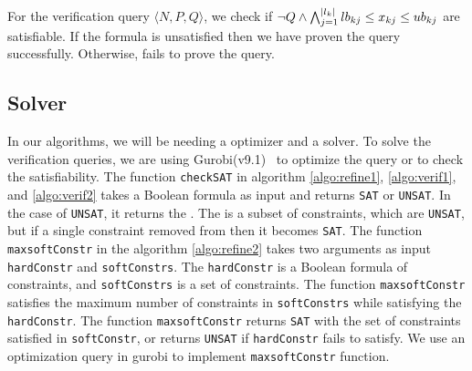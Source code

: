 For the verification query $\langle N, P, Q \rangle$, we check if
$\lnot Q \land \bigwedge_{j=1}^{|l_k|}lb_{kj} \leq x_{kj} \leq ub_{kj}$
are satisfiable.
%
If the formula is unsatisfied then we have proven the query successfully.
Otherwise, \deeppoly fails to prove the query.




\subsection{Solver}
\label{sec:solver}

In our algorithms, we will be needing a optimizer and a solver.
To solve the verification queries,
we are using Gurobi(v9.1)~\cite{gurobioptimizer} to optimize the query or to check the satisfiability. 
The function \texttt{checkSAT} in algorithm \ref{algo:refine1}, \ref{algo:verif1}, and
\ref{algo:verif2} 
takes a Boolean formula as input and returns \texttt{SAT} or \texttt{UNSAT}. 
In the case of \texttt{UNSAT}, it returns the \unsatcore{}. 
The \unsatcore{} is a subset of constraints, which are \texttt{UNSAT}, 
but if a single constraint removed from \unsatcore{} then it becomes \texttt{SAT}.
The function \texttt{maxsoftConstr} in the algorithm \ref{algo:refine2} takes
two arguments as input \texttt{hardConstr} and \texttt{softConstrs}. 
The \texttt{hardConstr} is a Boolean formula of constraints,
and \texttt{softConstrs} is a set of constraints. 
The function \texttt{maxsoftConstr} satisfies the maximum number of constraints
in \texttt{softConstrs} while satisfying the \texttt{hardConstr}. 
The function \texttt{maxsoftConstr} returns \texttt{SAT} with the set of
constraints satisfied in \texttt{softConstr}, or returns
\texttt{UNSAT} if \texttt{hardConstr} fails to satisfy.
We use an optimization query in gurobi to implement \texttt{maxsoftConstr} function.



